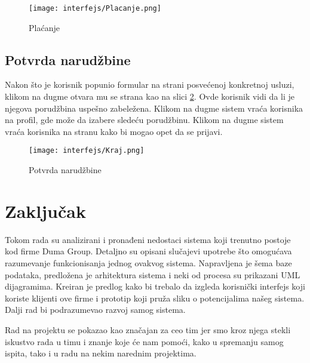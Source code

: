 \documentclass[a4paper]{article}
\begin{document}
\begin{figure}[H]
    \centering
    \texttt{[image: interfejs/Placanje.png]}
    \caption{Plaćanje}
    \label{fig:ki_placanje}
\end{figure}

\subsection{Potvrda narudžbine}

Nakon što je korisnik popunio formular na strani posvećenoj konkretnoj usluzi, klikom na dugme  otvara mu se strana kao na slici \ref{fig:ki_kraj}. Ovde korisnik vidi da li je njegova porudžbina uspešno zabeležena. Klikom na dugme  sistem vraća korisnika na profil, gde može da izabere sledeću porudžbinu. Klikom na dugme  sistem vraća korisnika na stranu  kako bi mogao opet da se prijavi.

\begin{figure}[H]
    \centering
    \texttt{[image: interfejs/Kraj.png]}
    \caption{Potvrda narudžbine}
    \label{fig:ki_kraj}
\end{figure}

\section{Zaključak}

Tokom rada su analizirani i pronađeni nedostaci sistema koji trenutno postoje kod firme Duma Group. Detaljno su opisani slučajevi upotrebe što omogućava razumevanje funkcionisanja jednog ovakvog sistema. Napravljena je šema baze podataka, predložena je arhitektura sistema i neki od procesa su prikazani UML dijagramima. Kreiran je predlog kako bi trebalo da izgleda korisnički interfejs koji koriste klijenti ove firme i prototip koji pruža sliku o potencijalima našeg sistema. Dalji rad bi podrazumevao razvoj samog sistema. 

Rad na projektu se pokazao kao značajan za ceo tim jer smo kroz njega stekli iskustvo rada u timu i znanje koje će nam pomoći, kako u spremanju samog ispita, tako i u radu na nekim narednim projektima. 
\end{document}
